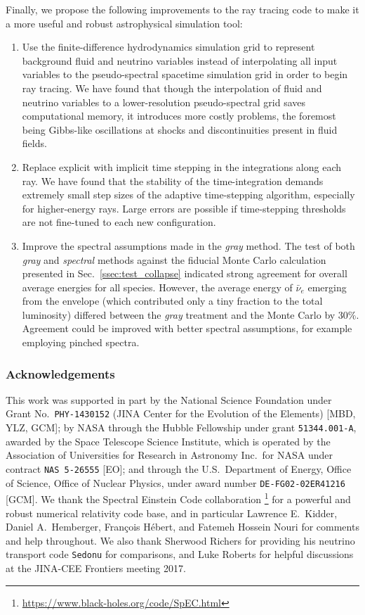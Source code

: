 \documentclass[aps,floatfix,prd,superscriptaddress,twocolumn]{revtex4-1}
\begin{document}
Finally, we propose the following improvements to the ray tracing code to make
it a more useful and robust astrophysical simulation tool:
\begin{enumerate}
\item Use the finite-difference hydrodynamics simulation grid to represent
  background fluid and neutrino variables instead of interpolating all
  input variables to the pseudo-spectral spacetime simulation grid in order
  to begin ray tracing.
  We have found that though the interpolation of fluid and neutrino variables
  to a lower-resolution pseudo-spectral grid saves computational memory, it
  introduces more costly problems, the foremost being Gibbs-like oscillations
  at shocks and discontinuities present in fluid fields.
\item Replace explicit with implicit time stepping in the integrations along
  each ray. We have found that the stability of the time-integration demands
  extremely small step sizes of the adaptive time-stepping algorithm, especially
  for higher-energy rays. Large errors are possible if time-stepping thresholds
  are not fine-tuned to each new configuration.
\item Improve the spectral assumptions made in the \emph{gray} method.
  The test of both \emph{gray} and \emph{spectral} methods against
  the fiducial Monte Carlo calculation presented in Sec.~\ref{ssec:test_collapse}
  indicated strong agreement for overall average energies for all species. 
  However, the average energy of $\bar{\nu}_e$ emerging from the envelope
  (which contributed only a tiny fraction to the total luminosity)
  differed between the \emph{gray} treatment and the Monte Carlo by 30\%.
  Agreement could be improved with better spectral assumptions, for example
  employing pinched spectra.
\end{enumerate}

\subsubsection*{Acknowledgements}
This work was supported in part by the National Science Foundation under Grant
No.\ \lstinline{PHY-1430152} (JINA Center for the Evolution of the Elements)
[MBD, YLZ, GCM];
by NASA through the Hubble Fellowship under grant \lstinline{51344.001-A},
awarded by the Space Telescope Science Institute,
which is operated  by the Association of Universities for Research in Astronomy Inc.\
for NASA under contract \lstinline{NAS 5-26555} [EO];
and through the U.S.\ Department of Energy, Office of Science,
Office of Nuclear Physics,
under award number \lstinline{DE-FG02-02ER41216} [GCM].
We thank the Spectral Einstein Code collaboration
\footnote{\url{https://www.black-holes.org/code/SpEC.html}} for a powerful and
robust numerical relativity code base, and in particular
Lawrence E.\ Kidder, Daniel A.\ Hemberger, Fran\c{c}ois H\'{e}bert,
and Fatemeh Hossein Nouri for comments and help throughout.
We also thank Sherwood Richers for providing his neutrino transport code
\lstinline{Sedonu} for comparisons,
and Luke Roberts for helpful discussions at the JINA-CEE Frontiers meeting 2017.
\end{document}
